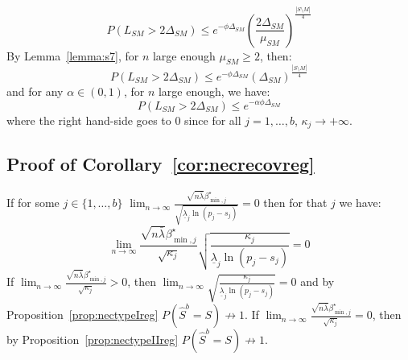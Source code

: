\documentclass[aos]{imsart}
\theoremstyle{plain}
\begin{document}
\begin{equation}
    P(L_{SM}> 2\Delta_{SM}) \leq e^{-\phi\Delta_{SM}}\left(\frac{2\Delta_{SM}}{\mu_{SM}}\right)^{\frac{|S\setminus M|}{4}}
\end{equation} 
By Lemma~\ref{lemma:s7}, for $n$ large enough $\mu_{SM} \geq 2$, then:
\begin{equation}
    P(L_{SM}> 2\Delta_{SM}) \leq e^{-\phi\Delta_{SM}}\left(\Delta_{SM}\right)^{\frac{|S\setminus M|}{4}}
\end{equation} 
and for any $\alpha\in(0,1)$, for $n$ large enough, we have:
\begin{equation}
    P(L_{SM}> 2\Delta_{SM}) \leq e^{-\alpha\phi\Delta_{SM}}
\end{equation} 
where the right hand-side goes to 0 since for all $j=1,\ldots,b$, $\kappa_j \to +\infty$. 

\subsection{Proof of Corollary~\ref{cor:necrecovreg}}
If for some $j\in\{1,\ldots,b\}$ $\lim_{n\to\infty}\frac{\sqrt{n\bar{\lambda}}\beta_{\min,j}^{\star}}{\sqrt{\underline{\lambda}_j\ln(p_j-s_j)}} = 0$ then for that $j$ we have:
$$\lim_{n\to\infty}\frac{\sqrt{n\bar{\lambda}}\beta_{\min,j}^{\star}}{\sqrt{\kappa_j}}\sqrt{\frac{\kappa_j}{\underline{\lambda}_j\ln(p_j-s_j)}} = 0$$
If $\lim_{n\to\infty}\frac{\sqrt{n\bar{\lambda}}\beta_{\min,j}^{\star}}{\sqrt{\kappa_j}}>0$, then $\lim_{n\to\infty}\sqrt{\frac{\kappa_j}{\underline{\lambda}_j\ln(p_j-s_j)}} = 0$ and by Proposition~\ref{prop:nectypeIreg} $P(\hat{S}^b=S)\not\to1$. If $\lim_{n\to\infty}\frac{\sqrt{n\bar{\lambda}}\beta_{\min,j}^{\star}}{\sqrt{\kappa_j}}=0$, then by Proposition~\ref{prop:nectypeIIreg} $P(\hat{S}^b=S)\not\to1$.
\end{document}
